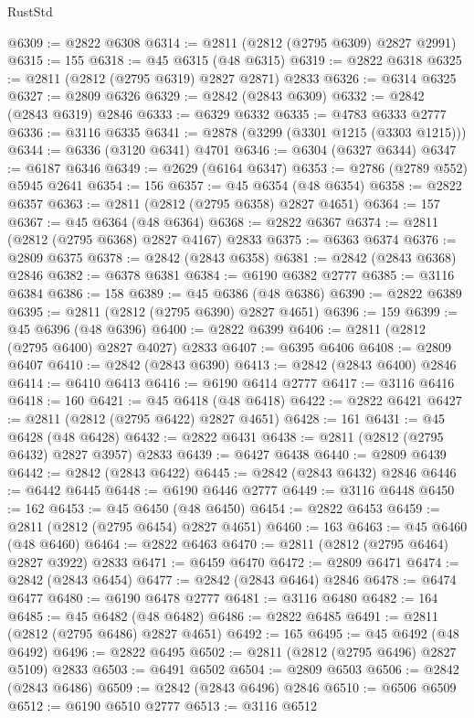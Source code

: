 \begin{lexlean}{RustStd}
\begin{coremodule}
@6309 := @2822 @6308
@6314 := @2811 (@2812 (@2795 @6309) @2827 @2991)
@6315 := 155
@6318 := @45 @6315 (@48 @6315)
@6319 := @2822 @6318
@6325 := @2811 (@2812 (@2795 @6319) @2827 @2871) @2833
@6326 := @6314 @6325
@6327 := @2809 @6326
@6329 := @2842 (@2843 @6309)
@6332 := @2842 (@2843 @6319) @2846
@6333 := @6329 @6332
@6335 := @4783 @6333 @2777
@6336 := @3116 @6335
@6341 := @2878 (@3299 (@3301 @1215 (@3303 @1215)))
@6344 := @6336 (@3120 @6341) @4701
@6346 := @6304 (@6327 @6344)
@6347 := @6187 @6346
@6349 := @2629 (@6164 @6347)
@6353 := @2786 (@2789 @552) @5945 @2641
@6354 := 156
@6357 := @45 @6354 (@48 @6354)
@6358 := @2822 @6357
@6363 := @2811 (@2812 (@2795 @6358) @2827 @4651)
@6364 := 157
@6367 := @45 @6364 (@48 @6364)
@6368 := @2822 @6367
@6374 := @2811 (@2812 (@2795 @6368) @2827 @4167) @2833
@6375 := @6363 @6374
@6376 := @2809 @6375
@6378 := @2842 (@2843 @6358)
@6381 := @2842 (@2843 @6368) @2846
@6382 := @6378 @6381
@6384 := @6190 @6382 @2777
@6385 := @3116 @6384
@6386 := 158
@6389 := @45 @6386 (@48 @6386)
@6390 := @2822 @6389
@6395 := @2811 (@2812 (@2795 @6390) @2827 @4651)
@6396 := 159
@6399 := @45 @6396 (@48 @6396)
@6400 := @2822 @6399
@6406 := @2811 (@2812 (@2795 @6400) @2827 @4027) @2833
@6407 := @6395 @6406
@6408 := @2809 @6407
@6410 := @2842 (@2843 @6390)
@6413 := @2842 (@2843 @6400) @2846
@6414 := @6410 @6413
@6416 := @6190 @6414 @2777
@6417 := @3116 @6416
@6418 := 160
@6421 := @45 @6418 (@48 @6418)
@6422 := @2822 @6421
@6427 := @2811 (@2812 (@2795 @6422) @2827 @4651)
@6428 := 161
@6431 := @45 @6428 (@48 @6428)
@6432 := @2822 @6431
@6438 := @2811 (@2812 (@2795 @6432) @2827 @3957) @2833
@6439 := @6427 @6438
@6440 := @2809 @6439
@6442 := @2842 (@2843 @6422)
@6445 := @2842 (@2843 @6432) @2846
@6446 := @6442 @6445
@6448 := @6190 @6446 @2777
@6449 := @3116 @6448
@6450 := 162
@6453 := @45 @6450 (@48 @6450)
@6454 := @2822 @6453
@6459 := @2811 (@2812 (@2795 @6454) @2827 @4651)
@6460 := 163
@6463 := @45 @6460 (@48 @6460)
@6464 := @2822 @6463
@6470 := @2811 (@2812 (@2795 @6464) @2827 @3922) @2833
@6471 := @6459 @6470
@6472 := @2809 @6471
@6474 := @2842 (@2843 @6454)
@6477 := @2842 (@2843 @6464) @2846
@6478 := @6474 @6477
@6480 := @6190 @6478 @2777
@6481 := @3116 @6480
@6482 := 164
@6485 := @45 @6482 (@48 @6482)
@6486 := @2822 @6485
@6491 := @2811 (@2812 (@2795 @6486) @2827 @4651)
@6492 := 165
@6495 := @45 @6492 (@48 @6492)
@6496 := @2822 @6495
@6502 := @2811 (@2812 (@2795 @6496) @2827 @5109) @2833
@6503 := @6491 @6502
@6504 := @2809 @6503
@6506 := @2842 (@2843 @6486)
@6509 := @2842 (@2843 @6496) @2846
@6510 := @6506 @6509
@6512 := @6190 @6510 @2777
@6513 := @3116 @6512

\end{coremodule}
\end{lexlean}
